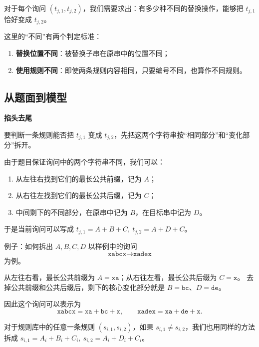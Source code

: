 \documentclass{book}
\begin{document}
对于每个询问 $(t_{j,1},t_{j,2})$，我们需要求出：有多少种不同的替换操作，能够把 $t_{j,1}$ 恰好变成 $t_{j,2}$。

这里的“不同”有两个判定标准：

\begin{enumerate}[itemsep=2pt, topsep=3pt, parsep=0pt, partopsep=0pt]
    \item \textbf{替换位置不同}：被替换子串在原串中的位置不同；
    \item \textbf{使用规则不同}：即使两条规则内容相同，只要编号不同，也算作不同规则。
\end{enumerate}

\subsection{从题面到模型}

\par\medskip
\noindent\textbf{掐头去尾}
\par\medskip
要判断一条规则能否把 $t_{j,1}$ 变成 $t_{j,2}$，先把这两个字符串按“相同部分”和“变化部分”拆开。

由于题目保证询问中的两个字符串不同，我们可以：
\begin{enumerate}[leftmargin=2em,itemsep=1pt,topsep=2pt,parsep=0pt,partopsep=0pt]
    \item 从左往右找到它们的最长公共前缀，记为 $A$；
    \item 从右往左找到它们的最长公共后缀，记为 $C$；
    \item 中间剩下的不同部分，在原串中记为 $B$，在目标串中记为 $D$。
\end{enumerate}

于是当前询问可以写成
$t_{j,1}=A+B+C,\ t_{j,2}=A+D+C$。

\begin{examplebox}{例子：如何拆出 $A,B,C,D$}
以样例中的询问
\[
\texttt{xabcx}\rightarrow\texttt{xadex}
\]
为例。

从左往右看，最长公共前缀为 $A=\texttt{xa}$；从右往左看，最长公共后缀为 $C=\texttt{x}$。  
去掉公共前缀和公共后缀后，剩下的核心变化部分就是 $B=\texttt{bc}$、$D=\texttt{de}$。

因此这个询问可以表示为
\[
\texttt{xabcx}=\texttt{xa}+\texttt{bc}+\texttt{x},\qquad
\texttt{xadex}=\texttt{xa}+\texttt{de}+\texttt{x}.
\]
\end{examplebox}

对于规则库中的任意一条规则 $(s_{i,1},s_{i,2})$，如果 $s_{i,1}\ne s_{i,2}$，我们也用同样的方法拆成
$s_{i,1}=A_i+B_i+C_i,\ s_{i,2}=A_i+D_i+C_i$。
\end{document}
